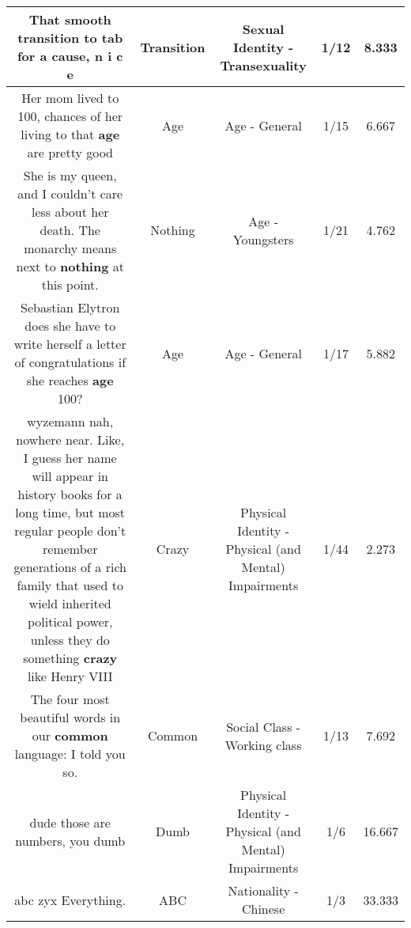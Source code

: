 \documentclass[11pt]{article}
\newlength\mylength
\begin{document}
\begin{center}
\begin{longtable}{|C{.65\mylength}|C{.30\mylength}|C{.12\mylength}|C{.12\mylength}|C{.12\mylength}|}
  \small That smooth \textbf{transition} to tab for a cause, n i c e\normalsize   & Transition & Sexual Identity - Transexuality & 1/12 & 8.333 \\  \hline
  \small Her mom lived to 100, chances of her living to that \textbf{age} are pretty good\normalsize   & Age & Age - General & 1/15 & 6.667 \\  \hline
  \small She is my queen, and I couldn't care less about her death. The monarchy means next to \textbf{nothing} at this point.\normalsize   & Nothing & Age - Youngsters & 1/21 & 4.762 \\  \hline
  \small Sebastian Elytron does she have to write herself a letter of congratulations if she reaches \textbf{age} 100?\normalsize   & Age & Age - General & 1/17 & 5.882 \\  \hline
  \small wyzemann nah, nowhere near. Like, I guess her name will appear in history books for a long time, but most regular people don't remember generations of a rich family that used to wield inherited political power, unless they do something \textbf{crazy} like Henry VIII\normalsize   & Crazy & Physical Identity - Physical (and Mental) Impairments & 1/44 & 2.273 \\  \hline
  \small The four most beautiful words in our \textbf{common} language: I told you so.\normalsize   & Common & Social Class - Working class & 1/13 & 7.692 \\  \hline
  \small dude those are numbers, you dumb\normalsize   & Dumb & Physical Identity - Physical (and Mental) Impairments & 1/6 & 16.667 \\  \hline
  \small abc zyx Everything.\normalsize   & ABC & Nationality - Chinese & 1/3 & 33.333 \\  \hline

\end{longtable}
\end{center}
\end{document}
